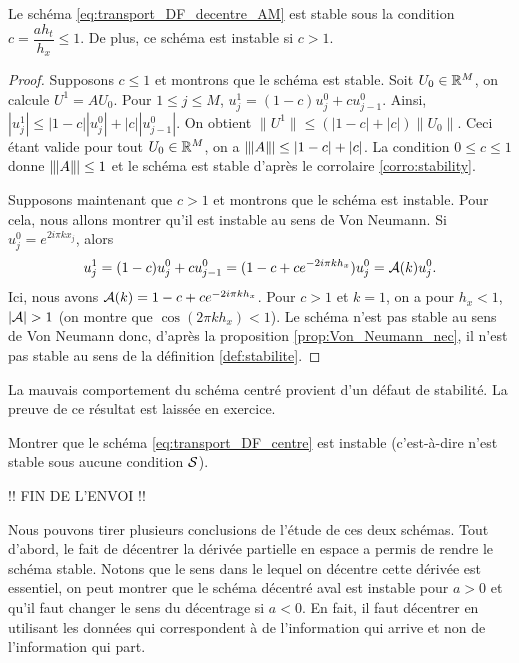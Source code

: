 \documentclass[12pt,a4paper,twoside]{article}
\begin{document}
\begin{proposition}
  \label{prop:stabilite_transport_AM}
  Le sch\'ema \eqref{eq:transport_DF_decentre_AM} est stable
  sous la condition $c = \dfrac{a h_t}{h_x} \leq 1$.
  De plus, ce sch\'ema est instable si $c > 1$.
\end{proposition}
\begin{proof}
  Supposons $c \leq 1$ et montrons que le sch\'ema est stable.
  Soit $U_0 \in \mathbb{R}^M$, on calcule $U^1 = A U_0$.
  Pour $1 \leq j \leq M$, 
  $u_j^1 = (1-c) u_j^0 + c u_{j-1}^0$.
  Ainsi, $|u_j^1| \leq |1-c| | u_j^0 | + | c | | u_{j-1}^0 |$.
  On obtient $\| U^1 \| \leq (|1-c| + |c|) \| U_0 \|$.
  Ceci \'etant valide pour tout $U_0 \in \mathbb{R}^M$, on a $\|\!\;\!| A \|\!\;\!| \leq |1-c| + |c|$.
  La condition $0 \leq c \leq 1$ donne $\|\!\;\!| A \|\!\;\!| \leq 1$ et le sch\'ema est stable 
  d'apr\`es le corrolaire \ref{corro:stability}.

  Supposons maintenant que $c > 1$ et montrons que le sch\'ema est instable.
  Pour cela, nous allons montrer qu'il est instable au sens de Von Neumann.
  Si $u_j^0 = e^{2i\pi k x_j}$, alors
  \[
    u_j^{1} = (1-c) u_j^0 + c u_{j-1}^0 = (1 - c + c e^{-2i\pi k h_x}) u_j^0 
    = \mathcal{A}(k) u_j^0.
  \]
  Ici, nous avons $\mathcal{A}(k) = 1 - c + c e^{-2i\pi k h_x}$.
  Pour $c > 1$ et $k=1$, on a pour $h_x<1$,
  $| \mathcal{A} | > 1$ (on montre que $\cos(2\pi k h_x) < 1$). 
  Le sch\'ema n'est pas stable au sens 
  de Von Neumann donc, d'apr\`es la proposition \ref{prop:Von_Neumann_nec},
  il n'est pas stable au sens de la d\'efinition \ref{def:stabilite}.
\end{proof}

La mauvais comportement du sch\'ema centr\'e provient d'un d\'efaut
de stabilit\'e. La preuve de ce r\'esultat est laiss\'ee en exercice.
\begin{exercise}
  Montrer que le sch\'ema \eqref{eq:transport_DF_centre} est instable
  (c'est-\`a-dire n'est stable sous aucune condition $\mathcal{S}$).
\end{exercise}


!! FIN DE L'ENVOI !!



Nous pouvons tirer plusieurs conclusions de l'\'etude de ces deux sch\'emas.
Tout d'abord, le fait de d\'ecentrer la d\'eriv\'ee partielle en espace
a permis de rendre le sch\'ema stable.
Notons que le sens dans le lequel on d\'ecentre cette d\'eriv\'ee est essentiel,
on peut montrer que le sch\'ema d\'ecentr\'e aval est instable pour 
$a>0$ et qu'il faut changer le sens du d\'ecentrage si $a<0$.
En fait, il faut d\'ecentrer en utilisant les donn\'ees qui correspondent
\`a de l'information qui arrive et non de l'information qui part.
\end{document}
